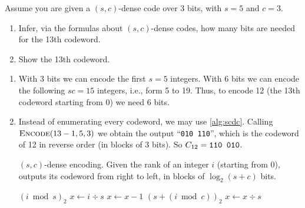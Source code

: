 \exercise

Assume you are given a $(s,c)$-dense code over 3 bits, with $s = 5$ and $c = 3$.
%
\begin{enumerate}

  \item Infer, via the formulas about $(s,c)$-dense codes, how many bits are
  needed for the 13th codeword.

  \item Show the 13th codeword.

\end{enumerate}

\solution

\begin{enumerate}

  \item With 3 bits we can encode the first $s = 5$ integers. With 6 bits we can
  encode the following $sc = 15$ integers, i.e., form 5 to 19. Thus, to encode
  12 (the 13th codeword starting from 0) we need 6 bits.

  \item Instead of enumerating every codeword, we may use \autoref{alg:scdc}.
  Calling $\text{\sc Encode}(13 - 1, 5, 3)$ we obtain the output ``{\tt 010
  110}'', which is the codeword of 12 in reverse order (in blocks of 3 bits). So
  $C_{12} = \text{\tt 110 010}$.
  \begin{algorithm}[t]

  \caption{$(s,c)$-dense encoding. Given the rank of an integer $i$ (starting
  from 0), outputs its codeword from right to left, in blocks of $\log_2 (s +
  c)$ bits\protect\footnotemark.}

  \label{alg:scdc}

  \begin{algorithmic}[1]
     $(i \bmod s)_2$
    \State $x \gets i \div s$
      \State $x \gets x - 1$
       $(s + (i \bmod c))_2$
      \State $x \gets x \div s$
    \EndWhile
  \EndProcedure
  \end{algorithmic}
  \end{algorithm}

\end{enumerate}
